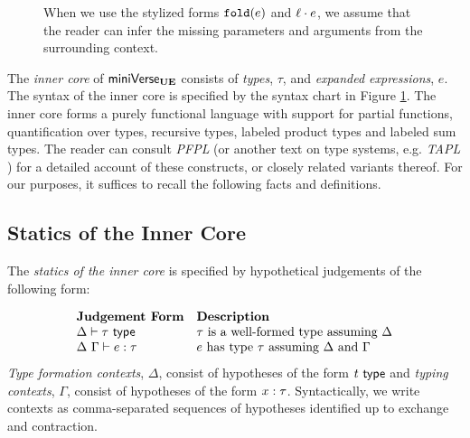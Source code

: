 \begin{figure}
{When we use the stylized forms $\texttt{fold}(e)$ and $\ell \cdot e$, we assume that the reader can infer the missing parameters and arguments from the surrounding context.}
\label{fig:U-expanded-terms}
\end{figure}

The \emph{inner core} of $\mathsf{miniVerse}_\textbf{UE}$ consists of \emph{types}, $\tau$, and \emph{expanded expressions}, $e$. The syntax of the inner core is specified by the syntax chart in Figure \ref{fig:U-expanded-terms}. 
The {inner core} forms a purely functional language with support for partial functions, quantification over types, recursive types, labeled product types and labeled sum types. The reader can consult \emph{PFPL} \cite{pfpl} (or another text on type systems, e.g. \emph{TAPL} \cite{tapl}) for a detailed account of these constructs, or closely related variants thereof. For our purposes, it suffices to recall the following facts and definitions.

\subsection{Statics of the Inner Core}
The \emph{statics of the inner core} is specified by hypothetical judgements of the following form:

\[\begin{array}{ll}
\textbf{Judgement Form} & \textbf{Description}\\
\Delta \vdash \tau~\mathsf{type} & \text{$\tau$ is a well-formed type assuming $\Delta$}\\
\Delta~\Gamma \vdash e : \tau & \text{$e$ has type $\tau$ assuming $\Delta$ and $\Gamma$}
\end{array}\]
\noindent
\emph{Type formation contexts}, $\Delta$, consist of hypotheses of the form $t~\mathsf{type}$ and \emph{typing contexts}, $\Gamma$, consist of hypotheses of the form $x : \tau$. Syntactically, we write contexts as comma-separated sequences of {hypotheses} identified up to exchange and contraction.

